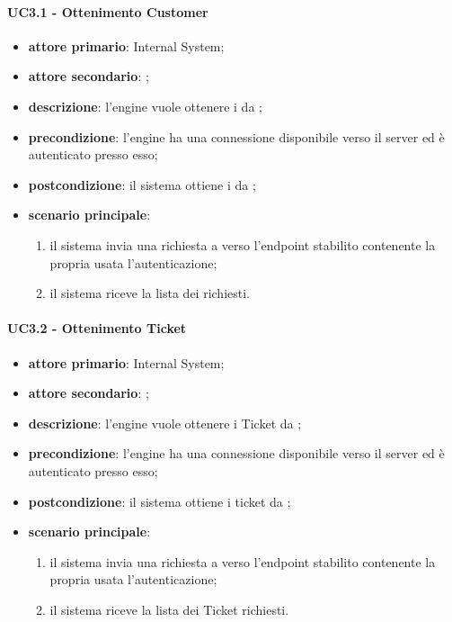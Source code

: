 \paragraph{UC3.1 - Ottenimento Customer}
\begin{itemize}
	\item \textbf{attore primario}: Internal System;
	\item \textbf{attore secondario}: ;
	\item \textbf{descrizione}: l'engine vuole ottenere i   da ;
	\item \textbf{precondizione}: l'engine ha una connessione disponibile verso il server  ed è autenticato presso esso;
	\item \textbf{postcondizione}: il sistema ottiene i   da ;
	\item \textbf{scenario principale}: 
	\begin{enumerate}
		\item il sistema invia una richiesta a  verso l'endpoint stabilito contenente la propria  usata l'autenticazione;
		\item il sistema riceve la lista dei   richiesti.
	\end{enumerate}
\end{itemize}
\paragraph{UC3.2 - Ottenimento Ticket}
\begin{itemize}
	\item \textbf{attore primario}: Internal System;
	\item \textbf{attore secondario}: ;
	\item \textbf{descrizione}: l'engine vuole ottenere i Ticket da ;
	\item \textbf{precondizione}: l'engine ha una connessione disponibile verso il server  ed è autenticato presso esso;
	\item \textbf{postcondizione}: il sistema ottiene i ticket da ;
	\item \textbf{scenario principale}: 
	\begin{enumerate}
		\item il sistema invia una richiesta a  verso l'endpoint stabilito contenente la propria  usata l'autenticazione;
		\item il sistema riceve la lista dei Ticket richiesti.
	\end{enumerate}
\end{itemize}
